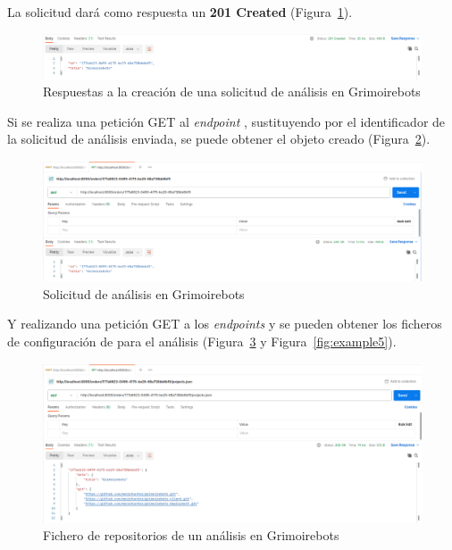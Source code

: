 La solicitud dará como respuesta un \textbf{201 Created} (Figura~\ref{fig:example2}).

\begin{figure}[ht]
    \centering
    \includegraphics[width=\textwidth]{Figures/example2}
    \decoRule
    \caption[Grimoirebots (Respuesta de creación de análisis)]{Respuestas a la creación de una solicitud de análisis en Grimoirebots}
    \label{fig:example2}
\end{figure}

Si se realiza una petición GET al \emph{endpoint} , sustituyendo  por el identificador de la solicitud de análisis enviada, se puede obtener el objeto creado (Figura~\ref{fig:example3}).

\begin{figure}[ht]
    \centering
    \includegraphics[width=\textwidth]{Figures/example3}
    \decoRule
    \caption[Grimoirebots (Solicitud de análisis)]{Solicitud de análisis en Grimoirebots}
    \label{fig:example3}
\end{figure}

Y realizando una petición GET a los \emph{endpoints}  y  se pueden obtener los ficheros de configuración de  para el análisis (Figura~\ref{fig:example4} y Figura~\ref{fig:example5}).

\begin{figure}[ht]
    \centering
    \includegraphics[width=\textwidth]{Figures/example4}
    \decoRule
    \caption[Análisis en Grimoirebots (Fichero de repositorios)]{Fichero de repositorios de un análisis en Grimoirebots}
    \label{fig:example4}
\end{figure}

